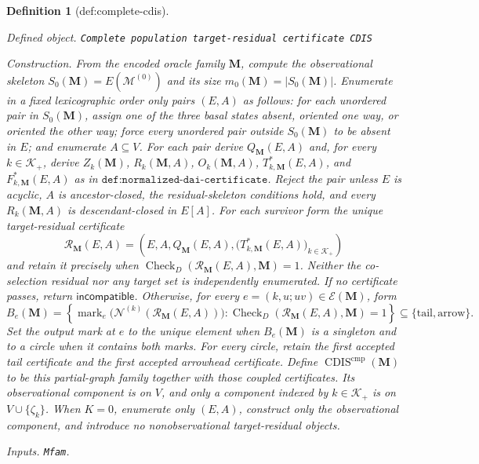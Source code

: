\documentclass{article}
\newtheorem{definition}{Definition}
\begin{document}
\begin{definition}[def:complete-cdis]\label{def:complete-cdis}
\par\smallskip\noindent\emph{Defined object.} \texttt{Complete population target-\allowbreak{}residual certificate CDIS}
\par\smallskip\noindent\emph{Construction.} From the encoded oracle family \(\mathbf M\), compute the observational skeleton \(S_0(\mathbf M)=E(\mathcal M^{(0)})\) and its size \(m_0(\mathbf M)=|S_0(\mathbf M)|\).  Enumerate in a fixed lexicographic order only pairs \((E,A)\) as follows: for each unordered pair in \(S_0(\mathbf M)\), assign one of the three basal states absent, oriented one way, or oriented the other way; force every unordered pair outside \(S_0(\mathbf M)\) to be absent in \(E\); and enumerate \(A\subseteq V\).  For each pair derive \(Q_{\mathbf M}(E,A)\) and, for every \(k\in\mathcal K_+\), derive \(Z_k(\mathbf M)\), \(R_k(\mathbf M,A)\), \(O_k(\mathbf M,A)\), \(T^*_{k,\mathbf M}(E,A)\), and \(F^*_{k,\mathbf M}(E,A)\) as in \(\texttt{def:normalized-dai-certificate}\).  Reject the pair unless \(E\) is acyclic, \(A\) is ancestor-closed, the residual-skeleton conditions hold, and every \(R_k(\mathbf M,A)\) is descendant-closed in \(E[A]\).  For each survivor form the unique target-residual certificate
\[
\mathcal R_{\mathbf M}(E,A)=
\left(E,A,Q_{\mathbf M}(E,A),
\bigl(T^*_{k,\mathbf M}(E,A)\bigr)_{k\in\mathcal K_+}\right)
\]
and retain it precisely when \(\operatorname{Check}_{D}(\mathcal R_{\mathbf M}(E,A),\mathbf M)=1\).  Neither the co-selection residual nor any target set is independently enumerated.  If no certificate passes, return \(\mathsf{incompatible}\).  Otherwise, for every \(e=(k,u;uv)\in\mathcal E(\mathbf M)\), form
\[
B_e(\mathbf M)=\left\{\operatorname{mark}_e\bigl(\mathcal N^{(k)}(\mathcal R_{\mathbf M}(E,A))\bigr):
\operatorname{Check}_{D}(\mathcal R_{\mathbf M}(E,A),\mathbf M)=1\right\}
\subseteq\{\mathrm{tail},\mathrm{arrow}\}.
\]
Set the output mark at \(e\) to the unique element when \(B_e(\mathbf M)\) is a singleton and to a circle when it contains both marks.  For every circle, retain the first accepted tail certificate and the first accepted arrowhead certificate.  Define \(\operatorname{CDIS}^{\mathrm{cmp}}(\mathbf M)\) to be this partial-graph family together with those coupled certificates.  Its observational component is on \(V\), and only a component indexed by \(k\in\mathcal K_+\) is on \(V\cup\{\zeta_k\}\).  When \(K=0\), enumerate only \((E,A)\), construct only the observational component, and introduce no nonobservational target-residual objects.
\par\smallskip\noindent\emph{Inputs.} \texttt{Mfam}.
\end{definition}
\end{document}
